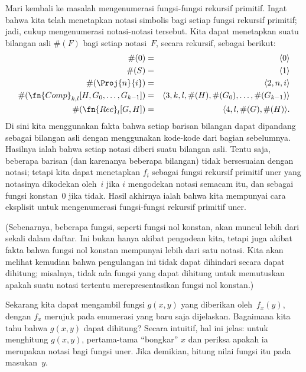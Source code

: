 \documentclass[../../../include/open-logic-section]{subfiles}
\begin{document}
Mari kembali ke masalah mengenumerasi fungsi-fungsi rekursif primitif. Ingat
bahwa kita telah menetapkan notasi simbolis bagi setiap fungsi rekursif
primitif; jadi, cukup mengenumerasi notasi-notasi tersebut. Kita dapat
menetapkan suatu bilangan asli $\#(F)$ bagi setiap notasi~$F$, secara rekursif,
sebagai berikut:
\begin{eqnarray*}
\#(0) & = & \langle 0 \rangle \\
\#(S) & = & \langle 1 \rangle \\
\#(\Proj{n}{i}) & = & \langle 2, n, i \rangle \\
\#(\fn{Comp}_{k,l}[H,G_0,\dots,G_{k-1}]) & = & \langle
3,k,l,\#(H),\#(G_0),\dots,\#(G_{k-1}) \rangle \\
\#(\fn{Rec}_l[G,H]) & = & \langle 4, l, \#(G), \#(H) \rangle.
\end{eqnarray*}
Di sini kita menggunakan fakta bahwa setiap barisan bilangan dapat dipandang
sebagai bilangan asli dengan menggunakan kode-kode dari bagian sebelumnya.
Hasilnya ialah bahwa setiap notasi diberi suatu bilangan asli. Tentu saja,
beberapa barisan (dan karenanya beberapa bilangan) tidak bersesuaian dengan
notasi; tetapi kita dapat menetapkan $f_i$ sebagai fungsi rekursif primitif
uner yang notasinya dikodekan oleh~$i$ jika $i$ mengodekan notasi semacam itu,
dan sebagai fungsi konstan~$0$ jika tidak. Hasil akhirnya ialah bahwa kita
mempunyai cara eksplisit untuk mengenumerasi fungsi-fungsi rekursif primitif
uner.

(Sebenarnya, beberapa fungsi, seperti fungsi nol konstan, akan muncul lebih
dari sekali dalam daftar. Ini bukan hanya akibat pengodean kita, tetapi juga
akibat fakta bahwa fungsi nol konstan mempunyai lebih dari satu notasi. Kita
akan melihat kemudian bahwa pengulangan ini tidak dapat dihindari secara
dapat dihitung; misalnya, tidak ada fungsi yang dapat dihitung untuk memutuskan
apakah suatu notasi tertentu merepresentasikan fungsi nol konstan.)

Sekarang kita dapat mengambil fungsi $g(x,y)$ yang diberikan oleh~$f_x(y)$,
dengan $f_x$ merujuk pada enumerasi yang baru saja dijelaskan. Bagaimana kita
tahu bahwa $g(x,y)$ dapat dihitung? Secara intuitif, hal ini jelas: untuk
menghitung $g(x,y)$, pertama-tama ``bongkar'' $x$ dan periksa apakah ia
merupakan notasi bagi fungsi uner. Jika demikian, hitung nilai fungsi itu pada
masukan~$y$.
\end{document}
